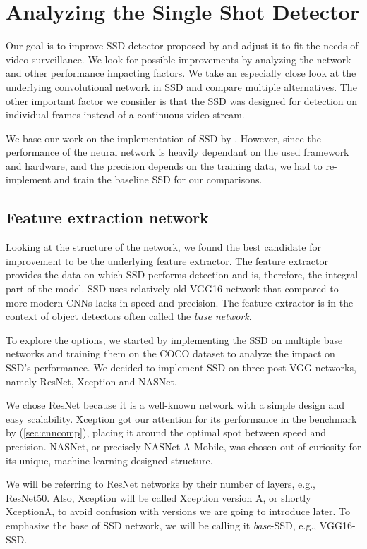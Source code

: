 \chapter{Analyzing the Single Shot Detector}

Our goal is to improve SSD detector proposed by \citeauthor{bib:ssd} and adjust it to fit the needs of video surveillance. We look for possible improvements by analyzing the network and other performance impacting factors. We take an especially close look at the underlying convolutional network in SSD and compare multiple alternatives. The other important factor we consider is that the SSD was designed for detection on individual frames instead of a continuous video stream.

We base our work on the implementation of SSD by \citeauthor{bib:ssd}. However, since the performance of the neural network is heavily dependant on the used framework and hardware, and the precision depends on the training data, we had to re-implement and train the baseline SSD for our comparisons.

\section{Feature extraction network}
\label{sec:base}
Looking at the structure of the network, we found the best candidate for improvement to be the underlying feature extractor. The feature extractor provides the data on which SSD performs detection and is, therefore, the integral part of the model. SSD uses relatively old VGG16 network that compared to more modern CNNs lacks in speed and precision.  The feature extractor is in the context of object detectors often called the \textit{base network}.

To explore the options, we started by implementing the SSD on multiple base networks and training them on the COCO dataset to analyze the impact on SSD's performance. We decided to implement SSD on three post-VGG networks, namely ResNet, Xception and NASNet. 

We chose ResNet because it is a well-known network with a simple design and easy scalability. Xception got our attention for its performance in the benchmark by \citeauthor{bib:cnnbenchmark} (\cref{sec:cnncomp}), placing it around the optimal spot between speed and precision. NASNet, or precisely NASNet-A-Mobile, was chosen out of curiosity for its unique, machine learning designed structure.

We will be referring to ResNet networks by their number of layers, e.g., ResNet50. Also, Xception will be called Xception version A, or shortly XceptionA, to avoid confusion with versions we are going to introduce later. To emphasize the base of SSD network, we will be calling it \textit{base}-SSD, e.g., VGG16-SSD.

